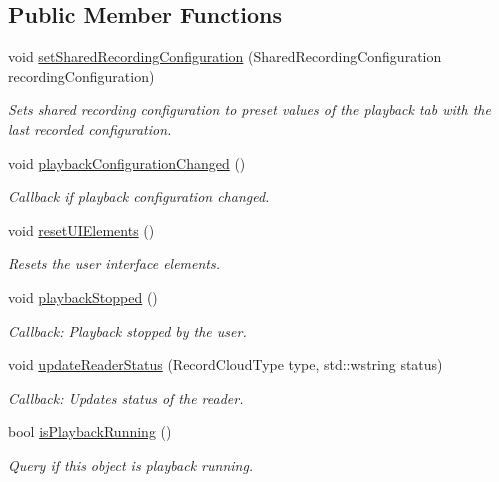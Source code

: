 \subsection*{Public Member Functions}
\begin{DoxyCompactItemize}
\item 
void \hyperlink{class_playback_tab_handler_ac84a8a5bfb60b66c2746430fe44237a6}{set\+Shared\+Recording\+Configuration} (Shared\+Recording\+Configuration recording\+Configuration)
\begin{DoxyCompactList}\small\item\em Sets shared recording configuration to preset values of the playback tab with the last recorded configuration. \end{DoxyCompactList}\item 
\hypertarget{class_playback_tab_handler_aa344dc13149292bbd32a8068a7f919a2}{}void \hyperlink{class_playback_tab_handler_aa344dc13149292bbd32a8068a7f919a2}{playback\+Configuration\+Changed} ()\label{class_playback_tab_handler_aa344dc13149292bbd32a8068a7f919a2}

\begin{DoxyCompactList}\small\item\em Callback if playback configuration changed. \end{DoxyCompactList}\item 
\hypertarget{class_playback_tab_handler_a6be44500c22b0928552cebee631f13e3}{}void \hyperlink{class_playback_tab_handler_a6be44500c22b0928552cebee631f13e3}{reset\+U\+I\+Elements} ()\label{class_playback_tab_handler_a6be44500c22b0928552cebee631f13e3}

\begin{DoxyCompactList}\small\item\em Resets the user interface elements. \end{DoxyCompactList}\item 
\hypertarget{class_playback_tab_handler_a58a83041028e5f631c4cb21bff4d1723}{}void \hyperlink{class_playback_tab_handler_a58a83041028e5f631c4cb21bff4d1723}{playback\+Stopped} ()\label{class_playback_tab_handler_a58a83041028e5f631c4cb21bff4d1723}

\begin{DoxyCompactList}\small\item\em Callback\+: Playback stopped by the user. \end{DoxyCompactList}\item 
void \hyperlink{class_playback_tab_handler_a6f1ecc2e4c7a42586d4dcb7a51597cc3}{update\+Reader\+Status} (Record\+Cloud\+Type type, std\+::wstring status)
\begin{DoxyCompactList}\small\item\em Callback\+: Updates status of the reader. \end{DoxyCompactList}\item 
bool \hyperlink{class_playback_tab_handler_aea458d2a38ab9b7940038f137a3a7ccf}{is\+Playback\+Running} ()
\begin{DoxyCompactList}\small\item\em Query if this object is playback running. \end{DoxyCompactList}\end{DoxyCompactItemize}
